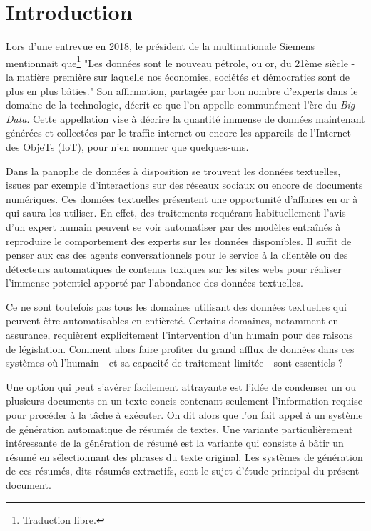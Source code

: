 \chapter*{Introduction}
\label{chap:introduction}

Lors d'une entrevue en 2018, le président de la multinationale Siemens 
mentionnait que\footnote{Traduction libre.} "Les données sont le nouveau pétrole, ou or,
du 21ème siècle - la matière première sur laquelle nos économies,
sociétés et démocraties sont de plus en plus bâties."
Son affirmation, partagée par bon nombre d'experts dans le domaine de la
technologie, décrit ce que l'on appelle communément l'ère du \textit{Big Data}.
Cette appellation vise à décrire la quantité immense de données maintenant 
générées et collectées par le traffic internet ou encore les appareils de 
l'Internet des ObjeTs (IoT), pour n'en nommer que quelques-uns.

Dans la panoplie de données à disposition se trouvent les données textuelles, 
issues par exemple d'interactions sur des réseaux sociaux ou encore de documents 
numériques.
Ces données textuelles présentent une opportunité d'affaires en or à qui saura
les utiliser.
En effet, des traitements requérant habituellement l'avis d'un expert humain 
peuvent se voir automatiser par des modèles entraînés à reproduire le comportement
des experts sur les données disponibles.
Il suffit de penser aux cas des agents conversationnels pour le service à 
la clientèle ou des détecteurs automatiques de contenus toxiques 
sur les sites webs pour réaliser l'immense potentiel apporté par l'abondance
des données textuelles.

Ce ne sont toutefois pas tous les domaines utilisant des données textuelles 
qui peuvent être automatisables en entièreté.
Certains domaines, notamment en assurance, requièrent explicitement l'intervention 
d'un humain pour des raisons de législation.
Comment alors faire profiter du grand afflux de données dans ces systèmes où l'humain - et
sa capacité de traitement limitée - sont essentiels ?

Une option qui peut s'avérer facilement attrayante est l'idée de condenser un ou plusieurs
documents en un texte concis contenant seulement l'information requise pour procéder à la
tâche à exécuter.
On dit alors que l'on fait appel à un système de génération automatique de résumés de textes.
Une variante particulièrement intéressante de la génération de résumé est la variante 
qui consiste à bâtir un résumé en sélectionnant des phrases du texte original.
Les systèmes de génération de ces résumés, dits résumés extractifs, 
sont le sujet d'étude principal du présent document.

